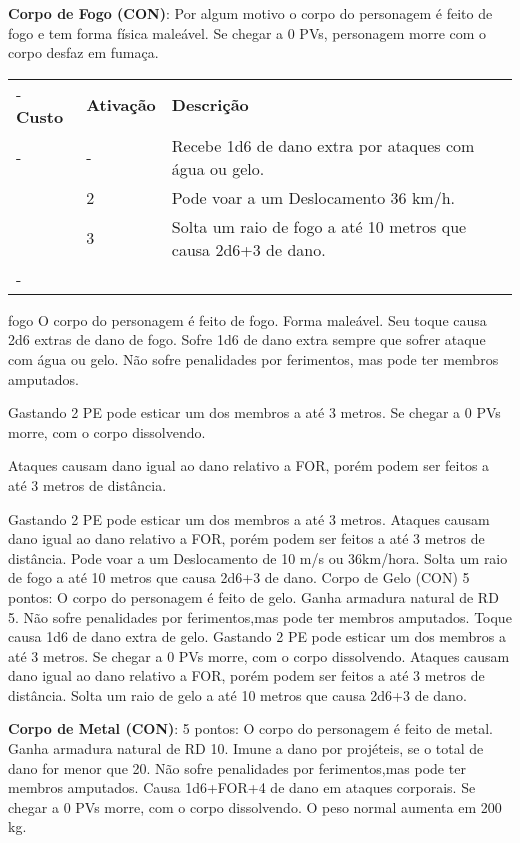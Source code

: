 \begin{small}
\textbf{Corpo de Fogo (CON)}: Por algum motivo o corpo do personagem é feito de fogo e tem forma física maleável. Se chegar a 0 PVs, personagem morre com o corpo desfaz em fumaça.

	\begin{tabu}{|X[c]|X[c]|X[3]|} \tabucline-
		\textbf{Custo} 	& \textbf{Ativação}	&	\textbf{Descrição} \\ \tabucline-
			& 	-	& Recebe 1d6 de dano extra por ataques com água ou gelo. \\ 
		& 	2	& Pode voar a um Deslocamento 36 km/h. \\ 
		&	3	&	Solta um raio de fogo a até 10 metros que causa 2d6+3 de dano.
		\\ \tabucline-
	\end{tabu}


fogo
O corpo do personagem é feito de fogo. Forma maleável. 
Seu toque causa 2d6 extras de dano de fogo. 
Sofre 1d6 de dano extra sempre que sofrer ataque com água ou gelo. Não sofre penalidades por ferimentos, mas pode ter membros amputados. 

Gastando 2 PE pode esticar um dos membros a até 3 metros. Se chegar a 0 PVs morre, com o corpo dissolvendo. 

Ataques causam dano igual ao dano relativo a
FOR, porém podem ser feitos a até 3 metros de distância. 

Gastando 2 PE pode esticar um dos membros a até 3 metros.  Ataques causam dano igual ao dano relativo a
FOR, porém podem ser feitos a até 3 metros de distância. Pode voar a um Deslocamento
de 10 m/s ou 36km/hora. Solta um raio de fogo a até 10 metros que causa 2d6+3 de
dano.
Corpo de Gelo (CON)
5 pontos: O corpo do personagem é feito de gelo. Ganha armadura natural de RD
5. Não sofre penalidades por ferimentos,mas pode ter membros amputados. Toque
causa 1d6 de dano extra de gelo. Gastando 2 PE pode esticar um dos membros a até 3
metros. Se chegar a 0 PVs morre, com o corpo dissolvendo. Ataques causam dano igual
ao dano relativo a FOR, porém podem ser feitos a até 3 metros de distância. Solta um
raio de gelo a até 10 metros que causa 2d6+3 de dano.

\textbf{Corpo de Metal (CON)}:
5 pontos: O corpo do personagem é feito de metal. Ganha armadura natural de
RD 10. Imune a dano por projéteis, se o total de dano for menor que 20. Não sofre
penalidades por ferimentos,mas pode ter membros amputados. Causa 1d6+FOR+4 de
dano em ataques corporais. Se chegar a 0 PVs morre, com o corpo dissolvendo. O peso
normal aumenta em 200 kg.


\end{small}
